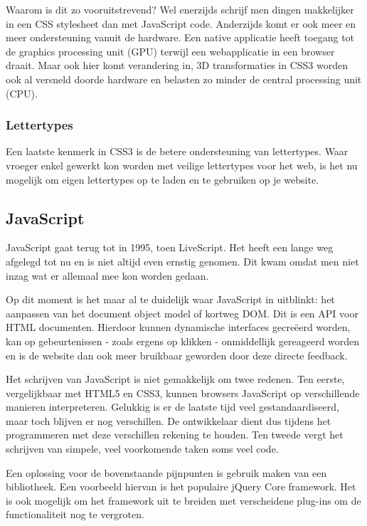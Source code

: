 Waarom is dit zo vooruitstrevend? Wel enerzijds schrijf men dingen makkelijker in een CSS stylesheet dan met JavaScript code. Anderzijds komt er ook meer en meer ondersteuning vanuit de hardware. Een native applicatie heeft toegang tot de graphics processing unit (GPU) terwijl een webapplicatie in een browser draait. Maar ook hier komt verandering in, 3D transformaties in CSS3 worden ook al versneld doorde hardware en belasten zo minder de central processing unit (CPU).

\subsubsection{Lettertypes}
Een laatste kenmerk in CSS3 is de betere ondersteuning van lettertypes. Waar vroeger enkel gewerkt kon worden met veilige lettertypes voor het web, is het nu mogelijk om eigen lettertypes op te laden en te gebruiken op je website.

\subsection{JavaScript}
JavaScript gaat terug tot in 1995, toen LiveScript. Het heeft een lange weg afgelegd tot nu en is niet altijd even ernstig genomen. Dit kwam omdat men niet inzag wat er allemaal mee kon worden gedaan. 

Op dit moment is het maar al te duidelijk waar JavaScript in uitblinkt: het aanpassen van het document object model of kortweg DOM. Dit is een API voor HTML documenten. Hierdoor kunnen dynamische interfaces gecreëerd worden, kan op gebeurtenissen - zoals ergens op klikken - onmiddellijk gereageerd worden en is de website dan ook meer bruikbaar geworden door deze directe feedback.

Het schrijven van JavaScript is niet gemakkelijk om twee redenen. Ten eerste, vergelijkbaar met HTML5 en CSS3, kunnen browsers JavaScript op verschillende manieren interpreteren. Gelukkig is er de laatste tijd veel gestandaardiseerd, maar toch blijven er nog verschillen. De ontwikkelaar dient dus tijdens het programmeren met deze verschillen rekening te houden. Ten tweede vergt het schrijven van simpele, veel voorkomende taken soms veel code.

Een oplossing voor de bovenstaande pijnpunten is gebruik maken van een bibliotheek. Een voorbeeld hiervan is het populaire jQuery Core framework. Het is ook mogelijk om het framework uit te breiden met verscheidene plug-ins om de functionaliteit nog te vergroten.

